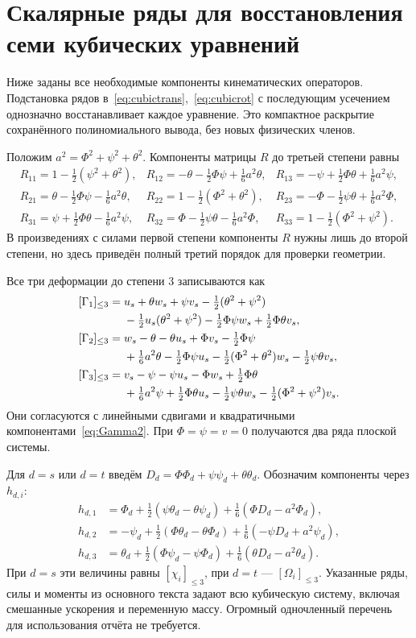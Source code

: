 \documentclass[11pt,a4paper]{article}
\begin{document}
\appendix
\section{Скалярные ряды для восстановления семи кубических уравнений}
Ниже заданы все необходимые компоненты кинематических операторов.
Подстановка рядов в~\eqref{eq:cubictrans},~\eqref{eq:cubicrot} с последующим усечением однозначно восстанавливает каждое уравнение. Это компактное раскрытие сохранённого полиномиального вывода, без новых физических членов.

Положим $a^2=\Phi^2+\psi^2+\theta^2$. Компоненты матрицы $R$ до третьей степени равны
\[
\begin{array}{lll}
R_{11}=1-\tfrac12(\psi^2+\theta^2),&
R_{12}=-\theta-\tfrac12\Phi\psi+\tfrac16a^2\theta,&
R_{13}=-\psi+\tfrac12\Phi\theta+\tfrac16a^2\psi,\\[4pt]
R_{21}=\theta-\tfrac12\Phi\psi-\tfrac16a^2\theta,&
R_{22}=1-\tfrac12(\Phi^2+\theta^2),&
R_{23}=-\Phi-\tfrac12\psi\theta+\tfrac16a^2\Phi,\\[4pt]
R_{31}=\psi+\tfrac12\Phi\theta-\tfrac16a^2\psi,&
R_{32}=\Phi-\tfrac12\psi\theta-\tfrac16a^2\Phi,&
R_{33}=1-\tfrac12(\Phi^2+\psi^2).
\end{array}
\]
В произведениях с силами первой степени компоненты $R$ нужны лишь до второй степени, но здесь приведён полный третий порядок для проверки геометрии.

Все три деформации до степени 3 записываются как
\[
\begin{aligned}
\relax[\Gamma_1]_{\leq3}={}&u_s+\theta w_s+\psi v_s-\tfrac12(\theta^2+\psi^2)\\
&-\tfrac12u_s(\theta^2+\psi^2)-\tfrac12\Phi\psi w_s+\tfrac12\Phi\theta v_s,\\
[\Gamma_2]_{\leq3}={}&w_s-\theta-\theta u_s+\Phi v_s-\tfrac12\Phi\psi\\
&+\tfrac16a^2\theta-\tfrac12\Phi\psi u_s
-\tfrac12(\Phi^2+\theta^2)w_s-\tfrac12\psi\theta v_s,\\
[\Gamma_3]_{\leq3}={}&v_s-\psi-\psi u_s-\Phi w_s+\tfrac12\Phi\theta\\
&+\tfrac16a^2\psi+\tfrac12\Phi\theta u_s
-\tfrac12\psi\theta w_s-\tfrac12(\Phi^2+\psi^2)v_s.
\end{aligned}
\]
Они согласуются с линейными сдвигами и квадратичными компонентами~\eqref{eq:Gamma2}. При $\Phi=\psi=v=0$ получаются два ряда плоской системы.

Для $d=s$ или $d=t$ введём $D_d=\Phi\Phi_d+\psi\psi_d+\theta\theta_d$. Обозначим компоненты через $h_{d,i}$:
\[
\begin{aligned}
h_{d,1}&=\Phi_d+\tfrac12(\psi\theta_d-\theta\psi_d)
+\tfrac16(\Phi D_d-a^2\Phi_d),\\
h_{d,2}&=-\psi_d+\tfrac12(\Phi\theta_d-\theta\Phi_d)
+\tfrac16(-\psi D_d+a^2\psi_d),\\
h_{d,3}&=\theta_d+\tfrac12(\Phi\psi_d-\psi\Phi_d)
+\tfrac16(\theta D_d-a^2\theta_d).
\end{aligned}
\]
При $d=s$ эти величины равны $[\chi_i]_{\leq3}$, при $d=t$ --- $[\Omega_i]_{\leq3}$. Указанные ряды, силы и моменты из основного текста задают всю кубическую систему, включая смешанные ускорения и переменную массу. Огромный одночленный перечень для использования отчёта не требуется.
\end{document}
